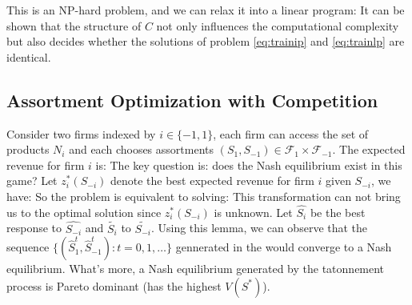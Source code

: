 \documentclass[10pt]{report}
\begin{document}
This is an NP-hard problem, and we can relax it into a linear program:
It can be shown that the structure of $C$ not only influences the computational complexity but also decides whether the solutions of problem \ref{eq:trainip} and \ref{eq:trainlp} are identical.

\subsection{Assortment Optimization with Competition}

Consider two firms indexed by $i\in\{-1,1\}$, each firm can access the set of products $N_i$ and each chooses assortments $(S_1,S_{-1})\in\mathcal{F}_1\times\mathcal{F}_{-1}$. The expected revenue for firm $i$ is:
The key question is: does the Nash equilibrium exist in this game? Let $z_i^*(S_{-i})$ denote the best expected revenue for firm $i$ given $S_{-i}$, we have:
So the problem is equivalent to solving:
This transformation can not bring us to the optimal solution since $z_i^*(S_{-i})$ is unknown. Let $\hat{S_{i}}$ be the best response to $\hat{S_{-i}}$ and $\tilde{S_{i}}$ to $\tilde{S_{-i}}$.
Using this lemma, we can observe that the sequence $\{(\hat{S}_1^t,\hat{S}_{-1}^t):t=0,1,\ldots\}$ gennerated in the  would converge to a Nash equilibrium. What's more, a Nash equilibrium generated by the tatonnement process is Pareto dominant (has the highest $V(S^*)$).
\end{document}
